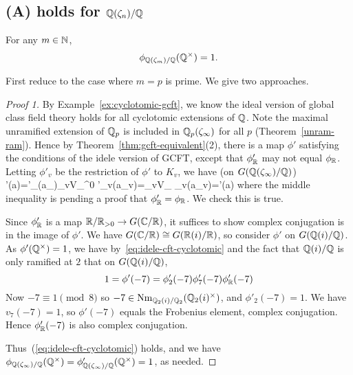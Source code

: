\subsection{(A) holds for $\mathbb{Q}(\zeta_n)/\mathbb{Q}$}
\begin{pr}
For any $m\in \mathbb{N}$, 
\[
\phi_{\mathbb{Q}(\zeta_m)/\mathbb{Q}}(\mathbb{Q}^{\times})=1.
\]
\end{pr}
First reduce to the case where $m=p$ is prime.
We give two approaches.\\

\begin{proof}[Proof 1]
By Example~\ref{ex:cyclotomic-gcft}, we know the ideal version of  global class field theory holds for all cyclotomic extensions of $\mathbb{Q}$. Note the maximal unramified extension of $\mathbb{Q}_p$ is included in $\mathbb{Q}_p(\zeta_{\infty})$ for all $p$ (Theorem~\ref{unram-ram}). Hence by Theorem~\ref{thm:gcft-equivalent}(2), there is a map $\phi'$ satisfying the conditions of the idele version of GCFT, except that $\phi'_{\mathbb{R}}$ may not equal $\phi_{\mathbb{R}}$. Letting $\phi'_v$ be the restriction of $\phi'$ to $K_v$, we have (on $G(\mathbb{Q}(\zeta_{\infty})/\mathbb{Q})$)
\phi'(\mathbf a)=\phi'_{\R}(a_{\R})\prod_{v\in V_{\Q}^0} \phi'_v(a_v)=\prod_{v\in V_{\Q}} \phi_v(a_v)=\phi'(\mathbf a)
\eeq
where the middle inequality is pending a proof that $\phi'_{\mathbb{R}}=\phi_{\mathbb{R}}$. We check this is true.

Since $\phi'_{\mathbb{R}}$ is a map $\mathbb{R}/\mathbb{R}_{>0}\to G(\mathbb{C}/\mathbb{R})$, it suffices to show complex conjugation is in the image of $\phi'$. We have $G(\mathbb{C}/\mathbb{R})\cong G(\mathbb{R}(i)/\mathbb{R})$, so consider $\phi'$ on $G(\mathbb{Q}(i)/\mathbb{Q})$. As $\phi'(\mathbb{Q}^{\times})=1$, we have by~\eqref{eq:idele-cft-cyclotomic} and the fact that $\mathbb{Q}(i)/\mathbb{Q}$ is only ramified at $2$ that on $G(\mathbb{Q}(i)/\mathbb{Q})$,
\[
1=\phi'(-7)=\phi'_2(-7)\phi'_7(-7)\phi'_{\mathbb{R}}(-7)
\]
Now $-7\equiv 1\pmod 8$ so $-7\in \operatorname{Nm}_{\mathbb{Q}_2(i)/\mathbb{Q}_2}(\mathbb{Q}_2(i)^{\times})$, and $\phi'_2(-7)=1$. We have $v_7(-7)=1$, so $\phi'(-7)$ equals the Frobenius element, complex conjugation. Hence $\phi'_{\mathbb{R}}(-7)$ is also complex conjugation.

Thus~(\ref{eq:idele-cft-cyclotomic}) holds, and we have $\phi_{\mathbb{Q}(\zeta_{\infty})/\mathbb{Q}}(\mathbb{Q}^{\times})=\phi'_{\mathbb{Q}(\zeta_{\infty})/\mathbb{Q}}(\mathbb{Q}^{\times})=1$, as needed.
\end{proof}
